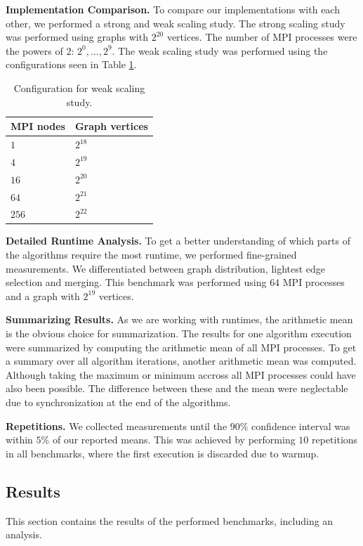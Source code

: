 \documentclass[letterpaper]{article}
\newcommand{\mypar}[1]{{\bf #1.}}
\begin{document}
\mypar{Implementation Comparison}
To compare our implementations with each other, we performed a strong and weak scaling study. The strong scaling study
was performed using graphs with $2^{20}$ vertices. The number of MPI processes were the powers of $2$: $2^0, \dotsc,
2^9$. The weak scaling study was performed using the configurations seen in Table \ref{tab:weakscaling-table}.
\begin{table}[h!]
  \centering
  \begin{tabular}{ll} \toprule
    \textbf{MPI nodes} & \textbf{Graph vertices} \\\midrule
    $1$ & $2^{18}$ \\ 
    $4$ & $2^{19}$ \\ 
    $16$ & $2^{20}$ \\
    $64$ & $2^{21}$ \\
    $256$ & $2^{22}$ \\ \bottomrule \hline
  \end{tabular}
  \caption{Configuration for weak scaling study.}
  \label{tab:weakscaling-table}
\end{table}

\mypar{Detailed Runtime Analysis}
To get a better understanding of which parts of the algorithms require the most runtime, we performed fine-grained
measurements. We differentiated between graph distribution, lightest edge selection and merging. This benchmark was
performed using $64$ MPI processes and a graph with $2^{19}$ vertices.

\mypar{Summarizing Results}
As we are working with runtimes, the arithmetic mean is the obvious choice for summarization. The results for one
algorithm execution were summarized by computing the arithmetic mean of all MPI processes. To get a summary over all
algorithm iterations, another arithmetic mean was computed. Although taking the maximum or minimum accross all MPI
processes could have also been possible. The difference between these and the mean were neglectable due to
synchronization at the end of the algorithms. %

\mypar{Repetitions}
We collected measurements until the $90\%$ confidence interval was within $5\%$ of our reported means. This was achieved
by performing $10$ repetitions in all benchmarks, where the first execution is discarded due to warmup.

\subsection{Results}
This section contains the results of the performed benchmarks, including an analysis.
\end{document}
